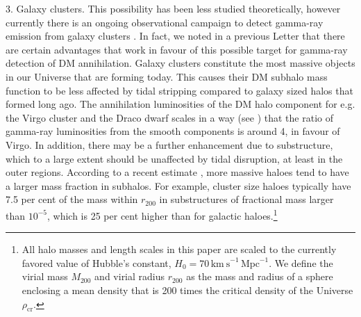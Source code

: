 \documentclass[10pt,aps,pra,reprint,amsmath,amsfonts,amssymb,showpacs,nofootinbib,floatfix]{revtex4-1}
\newcommand{\rmn}{\mathrm}
\newcommand{\rvir}{r_{200}}
\newcommand{\mvir}{M_{200}}
\begin{document}
3. Galaxy clusters. This possibility has been less studied
theoretically, however currently there is an ongoing observational
campaign to detect gamma-ray emission from galaxy clusters
\cite{2003ApJ...588..155R,2006ApJ...644..148P,2008AIPC.1085..569P,2009A&A...495...27A,2009arXiv0907.0727T,2009arXiv0907.5000G,2009IJMPD..18.1627D,2009A&A...495...27A,2009A&A...502..437A,2009ApJ...704..240K,2009ApJ...706L.275A,2010ApJ...710..634A,2010JCAP...05..025A,2010ApJ...717L..71A}.
In fact, we noted in a previous Letter \cite{2009PhRvL.103r1302P} that
there are certain advantages that work in favour of this possible
target for gamma-ray detection of DM annihilation. Galaxy clusters
constitute the most massive objects in our Universe that are forming
today. This causes their DM subhalo mass function to be less affected
by tidal stripping compared to galaxy sized halos that formed long
ago. The annihilation luminosities of the DM halo component for
e.g. the Virgo cluster and the Draco dwarf scales in a way (see
\cite{2009PhRvL.103r1302P}) that the ratio of gamma-ray luminosities
from the smooth components is around 4, in favour of Virgo. In
addition, there may be a further enhancement due to substructure,
which to a large extent should be unaffected by tidal disruption, at
least in the outer regions. According to a recent estimate
\cite{2011MNRAS.410.2309G}, more massive haloes tend to have a larger
mass fraction in subhalos. For example, cluster size haloes typically
have 7.5 per cent of the mass within $r_{200}$ in substructures of
fractional mass larger than $10^{-5}$, which is 25 per cent higher
than for galactic haloes.\footnote{All halo masses and length scales
  in this paper are scaled to the currently favored value of Hubble's
  constant, $H_0 = 70\, \rmn{km~s}^{-1}\,\rmn{Mpc}^{-1}$. We define
  the virial mass $\mvir$ and virial radius $\rvir$ as the mass and
  radius of a sphere enclosing a mean density that is 200 times the
  critical density of the Universe $\rho_{\rmn{cr}}$.}
\end{document}
